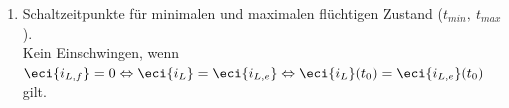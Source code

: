{\begin{enumerate}
\begin{align*}
        &= L \cdot \left( \frac{R_1}{R_2} + 1 \right) \cdot \frac{\mathrm{d}}{\mathrm{d}t}\, \eci{i_L} + R_1 \cdot \eci{i_L} \qquad \bigg| \cdot \frac{1}{R_1}\\
        \frac{\ecv{u_1}}{R_1} &= \underbrace{L \cdot \left( \frac{1}{R_1} + \frac{1}{R_2} \right)}_{\ =\tau} \cdot \frac{\mathrm{d}}{\mathrm{d}t}\, \eci{i_L} + \eci{i_L}\\ 
        \tau &= L \cdot \left( \frac{1}{R_1} + \frac{1}{R_2} \right) = \frac{L}{R_1||R_2}
    \end{align*}
    \item[c)] Schaltzeitpunkte für minimalen und maximalen flüchtigen Zustand ($t_{min},\ t_{max}$). \\ 
    Kein Einschwingen, wenn 
    $\eci{i_{L,f}}=0 \Leftrightarrow \eci{i_L}=\eci{i_{L,e}} \Leftrightarrow \eci{i_L}(t_0)=\eci{i_{L,e}}(t_0)$ gilt. \\
    

\end{enumerate}}
